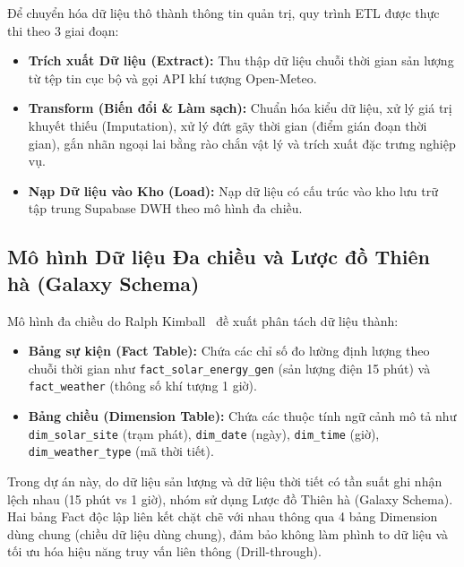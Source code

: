\documentclass[12pt, a4paper]{report}
\begin{document}
Để chuyển hóa dữ liệu thô thành thông tin quản trị, quy trình ETL được thực thi theo 3 giai đoạn:
\begin{itemize}[noitemsep]
    \item \textbf{Trích xuất Dữ liệu (Extract):} Thu thập dữ liệu chuỗi thời gian sản lượng từ tệp tin cục bộ và gọi API khí tượng Open-Meteo.
    \item \textbf{Transform (Biến đổi \& Làm sạch):} Chuẩn hóa kiểu dữ liệu, xử lý giá trị khuyết thiếu (Imputation), xử lý đứt gãy thời gian (điểm gián đoạn thời gian), gắn nhãn ngoại lai bằng rào chắn vật lý và trích xuất đặc trưng nghiệp vụ.
    \item \textbf{Nạp Dữ liệu vào Kho (Load):} Nạp dữ liệu có cấu trúc vào kho lưu trữ tập trung Supabase DWH theo mô hình đa chiều.
\end{itemize}

\subsection{Mô hình Dữ liệu Đa chiều và Lược đồ Thiên hà (Galaxy Schema)}
Mô hình đa chiều do Ralph Kimball~\cite{kimball2013dwh} đề xuất phân tách dữ liệu thành:
\begin{itemize}[noitemsep]
    \item \textbf{Bảng sự kiện (Fact Table):} Chứa các chỉ số đo lường định lượng theo chuỗi thời gian như \texttt{fact\_solar\_energy\_gen} (sản lượng điện 15 phút) và \texttt{fact\_weather} (thông số khí tượng 1 giờ).
    \item \textbf{Bảng chiều (Dimension Table):} Chứa các thuộc tính ngữ cảnh mô tả như \texttt{dim\_solar\_site} (trạm phát), \texttt{dim\_date} (ngày), \texttt{dim\_time} (giờ), \texttt{dim\_weather\_type} (mã thời tiết).
\end{itemize}

Trong dự án này, do dữ liệu sản lượng và dữ liệu thời tiết có tần suất ghi nhận lệch nhau (15 phút vs 1 giờ), nhóm sử dụng Lược đồ Thiên hà (Galaxy Schema). Hai bảng Fact độc lập liên kết chặt chẽ với nhau thông qua 4 bảng Dimension dùng chung (chiều dữ liệu dùng chung), đảm bảo không làm phình to dữ liệu và tối ưu hóa hiệu năng truy vấn liên thông (Drill-through).
\end{document}
